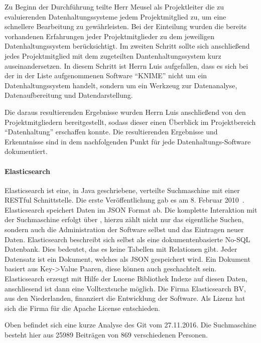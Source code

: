 Zu Beginn der Durchführung teilte Herr Meusel als Projektleiter die zu
evaluierenden Datenhaltungssysteme jedem Projektmitglied zu, um eine schnellere
Bearbeitung zu gewährleisten. Bei der Einteilung wurden die bereits vorhandenen
Erfahrungen jeder Projektmitglieder zu dem jeweiligen Datenhaltungssystem
berücksichtigt. Im zweiten Schritt sollte sich anschließend jedes
Projektmitglied mit dem zugeteilten Dantenhaltungssystem kurz
auseinandersetzen. In diesem Schritt ist Herrn Luis aufgefallen, dass es sich
bei der in der Liste aufgenommenen Software ``KNIME'' nicht um ein
Datenhaltungssystem handelt, sondern um ein Werkzeug zur Datenanalyse,
Datenaufbereitung und Datendarstellung.

Die daraus resultierenden Ergebnisse wurden Herrn Luis anschließend von den
Projektmitgliedern bereitgestellt, sodass dieser einen Überblick im
Projektbereich ``Datenhaltung'' erschaffen konnte. Die resultierenden
Ergebnisse und Erkenntnisse sind in dem nachfolgenden Punkt für jede
Datenhaltungs-Software dokumentiert.
\nl%

\paragraph{Elasticsearch}
\label{paragraph:elasticsearch}
Elasticsearch ist eine, in Java geschriebene, verteilte Suchmaschine mit einer
\gls{RESTful} Schnittstelle. Die erste Veröffentlichung gab es am 8. Februar
2010~\cite{es_release}. Elasticsearch speichert Daten im \gls{JSON} Format ab.
Die komplette Interaktion mit der Suchmaschine erfolgt über
, hierzu zählt nicht nur das eigentliche Suchen, sondern
auch die Administration der Software selbst und das Eintragen neuer Daten.
Elasticsearch beschreibt sich selbst als eine dokumentenbasierte No-SQL
Datenbank. Dies bedeutet, das es keine Tabellen mit Relationen gibt. Jeder
Datensatz ist ein Dokument, welches als JSON gespeichert wird. Ein Dokument
basiert aus Key->Value Paaren, diese können auch geschachtelt sein.
Elasticsearch erzeugt mit Hilfe der \gls{Lucene} Bibliothek Indexe auf diesen
Daten, anschliesend ist dann eine Volltextsuche möglich. Die Firma
Elasticsearch BV, aus den Niederlanden, finanziert die Entwicklung der
Software. Als Lizenz hat sich die Firma für die Apache License entschieden.



Oben befindet sich eine kurze Analyse des \gls{Git}
 vom 27.11.2016. Die Suchmaschine besteht
hier aus 25989 Beiträgen von 869 verschiedenen Personen.

